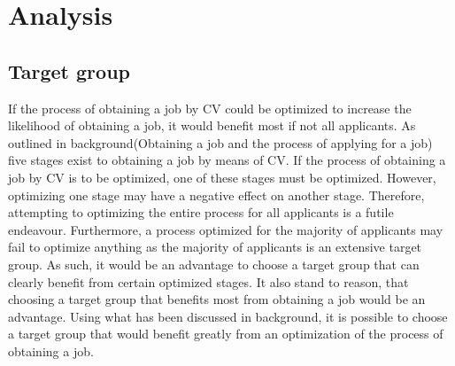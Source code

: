\section{Analysis}\label{sec:analysis}

\subsection{Target group}
If the process of obtaining a job by CV could be optimized to increase the likelihood of obtaining a job, it would benefit most if not all applicants.
As outlined in background(Obtaining a job and the process of applying for a job) five stages exist to obtaining a job by means of CV.
If the process of obtaining a job by CV is to be optimized, one of these stages must be optimized. 
However, optimizing one stage may have a negative effect on another stage.
Therefore, attempting to optimizing the entire process for all applicants is a futile endeavour.
Furthermore, a process optimized for the majority of applicants may fail to optimize anything as the majority of applicants is an extensive target group.
As such, it would be an advantage to choose a target group that can clearly benefit from certain optimized stages.
It also stand to reason, that choosing a target group that benefits most from obtaining a job would be an advantage.
Using what has been discussed in background, it is possible to choose a target group that would benefit greatly from an optimization of the process of obtaining a job. \\


